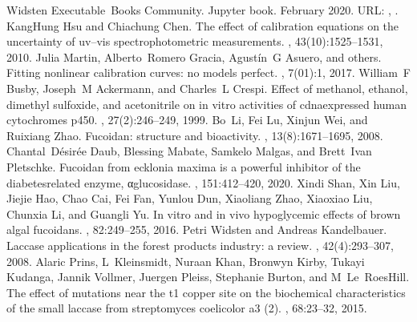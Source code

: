 \documentclass[letterpaper,12pt,english]{jupyterBook}
\begin{document}
\begin{sphinxthebibliography}{Widsten }
\sphinxAtStartPar
Executable Books Community. Jupyter book. February 2020. URL: , .
\sphinxAtStartPar
Kang\sphinxhyphen{}Hung Hsu and Chiachung Chen. The effect of calibration equations on the uncertainty of uv–vis spectrophotometric measurements. , 43(10):1525–1531, 2010.
\sphinxAtStartPar
Julia Martin, Alberto Romero Gracia, Agustín G Asuero, and others. Fitting nonlinear calibration curves: no models perfect. , 7(01):1, 2017.
\sphinxAtStartPar
William F Busby, Joseph M Ackermann, and Charles L Crespi. Effect of methanol, ethanol, dimethyl sulfoxide, and acetonitrile on in vitro activities of cdna\sphinxhyphen{}expressed human cytochromes p\sphinxhyphen{}450. , 27(2):246–249, 1999.
\sphinxAtStartPar
Bo Li, Fei Lu, Xinjun Wei, and Ruixiang Zhao. Fucoidan: structure and bioactivity. , 13(8):1671–1695, 2008.
\sphinxAtStartPar
Chantal Désirée Daub, Blessing Mabate, Samkelo Malgas, and Brett Ivan Pletschke. Fucoidan from ecklonia maxima is a powerful inhibitor of the diabetes\sphinxhyphen{}related enzyme, α\sphinxhyphen{}glucosidase. , 151:412–420, 2020.
\sphinxAtStartPar
Xindi Shan, Xin Liu, Jiejie Hao, Chao Cai, Fei Fan, Yunlou Dun, Xiaoliang Zhao, Xiaoxiao Liu, Chunxia Li, and Guangli Yu. In vitro and in vivo hypoglycemic effects of brown algal fucoidans. , 82:249–255, 2016.
\sphinxAtStartPar
Petri Widsten and Andreas Kandelbauer. Laccase applications in the forest products industry: a review. , 42(4):293–307, 2008.
\sphinxAtStartPar
Alaric Prins, L Kleinsmidt, Nuraan Khan, Bronwyn Kirby, Tukayi Kudanga, Jannik Vollmer, Juergen Pleiss, Stephanie Burton, and M Le Roes\sphinxhyphen{}Hill. The effect of mutations near the t1 copper site on the biochemical characteristics of the small laccase from streptomyces coelicolor a3 (2). , 68:23–32, 2015.

\end{sphinxthebibliography}
\end{document}
